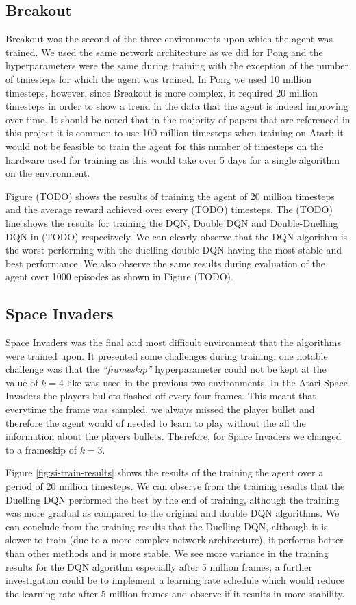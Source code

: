 \subsection{Breakout}
Breakout was the second of the three environments upon which the agent was trained. We used the same network architecture as we did for Pong and the hyperparameters were the same during training with the exception of the number of timesteps for which the agent was trained. In Pong we used 10 million timesteps, however, since Breakout is more complex, it required 20 million timesteps in order to show a trend in the data that the agent is indeed improving over time. It should be noted that in the majority of papers that are referenced in this project it is common to use 100 million timesteps when training on Atari; it would not be feasible to train the agent for this number of timesteps on the hardware used for training as this would take over 5 days for a single algorithm on the environment.

Figure (TODO) shows the results of training the agent of 20 million timesteps and the average reward achieved over every (TODO) timesteps. The (TODO) line shows the results for training the DQN, Double DQN and Double-Duelling DQN in (TODO) respecitvely. We can clearly observe that the DQN algorithm is the worst performing with the duelling-double DQN having the most stable and best performance. We also observe the same results during evaluation of the agent over 1000 episodes as shown in Figure (TODO).

\subsection{Space Invaders}
Space Invaders was the final and most difficult environment that the algorithms were trained upon. It presented some challenges during training, one notable challenge was that the \textit{``frameskip''} hyperparameter could not be kept at the value of $k = 4$ like was used in the previous two environments. In the Atari Space Invaders the players bullets flashed off every four frames. This meant that everytime the frame was sampled, we always missed the player bullet and therefore the agent would of needed to learn to play without the all the information about the players bullets. Therefore, for Space Invaders we changed to a frameskip of $k = 3$.

Figure \ref{fig:si-train-results} shows the results of the training the agent over a period of 20 million timesteps. We can observe from the training results that the Duelling DQN performed the best by the end of training, although the training was more gradual as compared to the original and double DQN algorithms. We can conclude from the training results that the Duelling DQN, although it is slower to train (due to a more complex network architecture), it performs better than other methods and is more stable. We see more variance in the training results for the DQN algorithm especially after 5 million frames; a further investigation could be to implement a learning rate schedule which would reduce the learning rate after 5 million frames and observe if it results in more stability.

